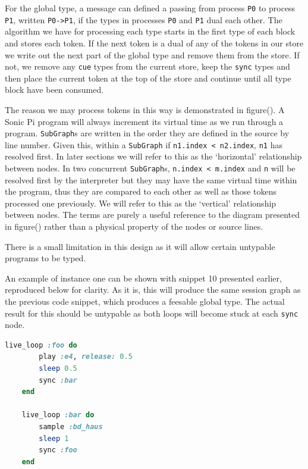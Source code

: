 \documentclass[11pt]{scrartcl}
\begin{document}
For the global type, a message can defined a passing from process \texttt{P0}
to process \texttt{P1}, written \texttt{P0->P1}, if the types in processes 
\texttt{P0} and \texttt{P1} dual each other. The algorithm we have for processing
each type starts in the first type of each block and stores each token. If
the next token is a dual of any of the tokens in our store we write out the
next part of the global type and remove them from the store. If not, we
remove any \texttt{cue} types from the current store, keep the \texttt{sync} 
types and then place the current token at the top of the store and continue 
until all type block have been consumed.


The reason we may process tokens in this way is demonstrated in figure().
A Sonic Pi program will always increment its virtual time as we run through a
program. \texttt{SubGraph}s are written in the order they are defined in 
the source by line number. Given this, within a \texttt{SubGraph} if
\texttt{n1.index < n2.index}, \texttt{n1} has resolved first. In later sections
we will refer to this as the `horizontal' relationship between nodes. In 
two concurrent \texttt{SubGraph}s, \texttt{n.index < m.index} and \texttt{n} 
will be resolved first by the interpreter but they may have the same virtual 
time within the program, thus they are compared to each other as well as 
those tokens processed one previously. We will refer to this as the `vertical'
relationship between nodes. The terms are purely a useful reference to the
diagram presented in figure() rather than a physical property of the nodes
or source lines.

There is a small limitation in this design as it will allow certain untypable
programs to be typed.

An example of instance one can be shown with snippet 10 presented earlier, 
reproduced below for clarity. As it is, this will produce the same session
graph as the previous code snippet, which produces a feesable global type.
The actual result for this should be untypable as both loops will become stuck
at each \texttt{sync} node. 

\begin{minipage}{\textwidth}
	\begin{lstlisting}[language = ruby]
	live_loop :foo do
	    play :e4, release: 0.5
	    sleep 0.5
	    sync :bar
	end

	live_loop :bar do
	    sample :bd_haus
	    sleep 1
	    sync :foo
	end
	\end{lstlisting}
\end{minipage}
\end{document}
